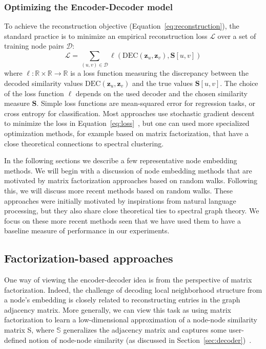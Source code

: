 \subsubsection{Optimizing the Encoder-Decoder model}
To achieve the reconstruction objective (Equation~\eqref{eq:reconstruction}), the standard practice is to minimize an empirical reconstruction loss $\mathcal{L}$ over a set of training node pairs $\mathcal{D}$:
\begin{equation}\label{eq:loss}
    \mathcal{L} = \sum_{(u,v)\in\mathcal{D}} \ell(\text{DEC}(\mathbf{z}_u, \mathbf{z}_v), \textbf{S}[u,v])
\end{equation}
where $\ell: \mathbb{R}\times\mathbb{R}\to\mathbb{R}$ is a loss function measuring the discrepancy between the decoded similarity values $\text{DEC}(\mathbf{z}_u, \mathbf{z}_v)$ and the true values $\textbf{S}[u,v]$. The choice of the loss function $\ell$ depends on the used decoder and the chosen similarity measure $\textbf{S}$. Simple loss functions are mean-squared error for regression tasks, or cross entropy for classification. Most approaches use stochastic gradient descent to minimize the loss in Equation~\eqref{eq:loss}~\cite{Robbins1951stochasticApproximation}, but one can used more specialized optimization methods, for example based on matrix factorization, that have a close theoretical connections to spectral clustering. 

In the following sections we describe a few representative node embedding methods. We will begin with a discussion of node embedding methods that are motivated by matrix factorization approaches based on random walks. Following this, we will discuss more recent methods based on random walks. These approaches were initially motivated by inspirations from natural language processing, but they also share close theoretical ties to spectral graph theory. We focus on these more recent methods seen that we have used them to have a baseline measure of performance in our experiments. 

\subsection{Factorization-based approaches}\label{sec:factorization}
One way of viewing the encoder-decoder idea is from the perspective of matrix factorization. Indeed, the challenge of decoding local neighborhood structure from a node's embedding is closely related to reconstructing entries in the graph adjacency matrix. More generally, we can view this task as using matrix factorization to learn a low-dimensional approximation of a node-node similarity matrix S, where $\mathbb{S}$ generalizes the adjacency matrix and captures some user-defined notion of node-node similarity (as discussed in Section~\ref{sec:decoder})~\cite{Belkin2001laplacianEigenmapsSpectralClusteringTechniquesEmbeddingClustering}\cite{Kruskal1964MultidimensionalScalingOptimizingGoodnessFitNonmetricHypothesis}.
